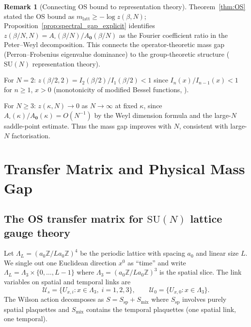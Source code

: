 \documentclass[11pt,a4paper]{amsart}
\theoremstyle{definition}
\newtheorem{remark}[theorem]{Remark}
\newcommand{\SU}{\mathrm{SU}}
\newcommand{\Z}{\mathbb{Z}}
\begin{document}
\begin{remark}[Connecting OS bound to representation theory]
\label{rem:OS_rep_theory}
Theorem~\ref{thm:OS} stated the OS bound as $m_{\mathrm{latt}} \ge -\log z(\beta,N)$;
Proposition~\ref{prop:spectral_gap_explicit} identifies $z(\beta/N,N)
= A_\square(\beta/N)/A_\mathbf{0}(\beta/N)$ as the Fourier coefficient ratio
in the Peter--Weyl decomposition.  This connects the operator-theoretic
mass gap (Perron--Frobenius eigenvalue dominance) to the group-theoretic
structure ($\SU(N)$ representation theory).

For $N=2$: $z(\beta/2,2) = I_2(\beta/2)/I_1(\beta/2) < 1$ since
$I_n(x)/I_{n-1}(x) < 1$ for $n \ge 1$, $x > 0$ (monotonicity of
modified Bessel functions, \cite[§10.37]{DLMF}).

For $N \ge 3$: $z(\kappa,N) \to 0$ as $N\to\infty$ at fixed $\kappa$,
since $A_\square(\kappa)/A_\mathbf{0}(\kappa) = O(N^{-1})$ by the
Weyl dimension formula and the large-$N$ saddle-point estimate.
Thus the mass gap improves with $N$, consistent with large-$N$ factorisation.
\end{remark}

\section{Transfer Matrix and Physical Mass Gap}
\label{sec:transfer}

\subsection{The OS transfer matrix for $\SU(N)$ lattice gauge theory}
\label{sec:transfer_def}

Let $\Lambda_L = (a_0\Z/La_0\Z)^4$ be the periodic lattice with spacing $a_0$ and
linear size $L$.  We single out one Euclidean direction $x^0$ as ``time'' and
write $\Lambda_L = \Lambda_3 \times \{0,\ldots,L-1\}$ where
$\Lambda_3 = (a_0\Z/La_0\Z)^3$ is the spatial slice.
The link variables on spatial and temporal links are
\[
   \mathcal{U}_s = \{ U_{x,i} : x\in\Lambda_3,\; i=1,2,3 \}, \qquad
   \mathcal{U}_0 = \{ U_{x,0} : x\in\Lambda_3 \}.
\]
The Wilson action decomposes as $S = S_{\text{sp}} + S_{\text{mix}}$ where
$S_{\text{sp}}$ involves purely spatial plaquettes and
$S_{\text{mix}}$ contains the temporal plaquettes (one spatial link, one temporal).
\end{document}
